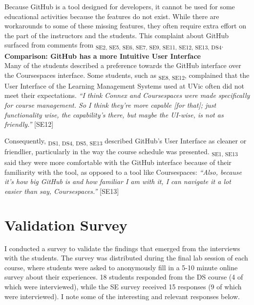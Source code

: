 Because GitHub is a tool designed for developers, it cannot be used for some educational activities because the features do not exist. While there are workarounds to some of these missing features, they often require extra effort on the part of the instructors and the students. This complaint about GitHub surfaced from comments from \textsubscript{SE2, SE5, SE6, SE7, SE9, SE11, SE12, SE13, DS4}. \\

\textbf{Comparison: GitHub has a more Intuitive User Interface} \\
Many of the students described a preference towards the GitHub interface over the Coursespaces interface. Some students, such as \textsubscript{SE8, SE12}, complained that the User Interface of the Learning Management Systems used at UVic often did not meet their expectations. \textit{``I think Connex and Coursespaces were made specifically for course management. So I think they're more capable [for that]; just functionality wise, the capability's there, but maybe the UI-wise, is not as friendly.''} [SE12]

Consequently, \textsubscript{DS1, DS4, DS5, SE13} described GitHub's User Interface as cleaner or friendlier, particularly in the way the course schedule was presented. \textsubscript{SE1, SE13} said they were more comfortable with the GitHub interface because of their familiarity with the tool, as opposed to a tool like Coursespaces: \textit{``Also, because it's how big GitHub is and how familiar I am with it, I can navigate it a lot easier than say, Coursespaces.''} [SE13]


\section{Validation Survey}
I conducted a survey to validate the findings that emerged from the interviews with the students. The survey was distributed during the final lab session of each course, where students were asked to anonymously fill in a 5-10 minute online survey about their experiences. 18 students responded from the DS course (4 of which were interviewed), while the SE survey received 15 responses (9 of which were interviewed). I note some of the interesting and relevant responses below.

